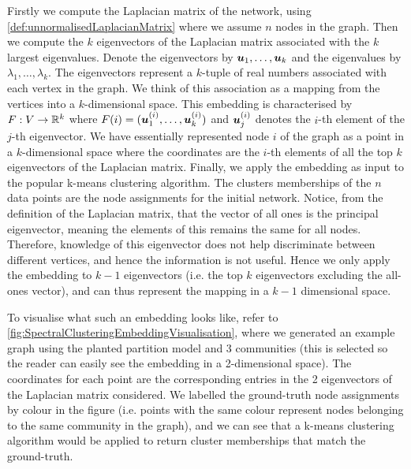Firstly we compute the Laplacian matrix of the network, using \cref{def:unnormalisedLaplacianMatrix} where we assume $n$ nodes in the graph.
Then we compute the $k$ eigenvectors of the Laplacian matrix associated with the $k$ largest eigenvalues.
Denote the eigenvectors by $\vecvar{u}_{1},\dots,\vecvar{u}_{k}$ and the eigenvalues by $\lambda_{1},\dots,\lambda_{k}$.
The eigenvectors represent a $k$-tuple of real numbers associated with each vertex in the graph. 
We think of this association as a mapping from the vertices into a $k$-dimensional space.
This embedding is characterised by $F : V \rightarrow \mathbb{R}^{k}$ where $F(i) = (\vecvar{u}_{1}^{(i)},\dots,\vecvar{u}_{k}^{(i)})$ and $\vecvar{u}_{j}^{(i)}$ denotes the $i$-th element of the $j$-th eigenvector.
We have essentially represented node $i$ of the graph as a point in a $k$-dimensional space where the coordinates are the $i$-th elements of all the top $k$ eigenvectors of the Laplacian matrix.
Finally, we apply the embedding as input to the popular k-means clustering algorithm.
The clusters memberships of the $n$ data points are the node assignments for the initial network.
Notice, from the definition of the Laplacian matrix, that the vector of all ones is the principal eigenvector, meaning the elements of this remains the same for all nodes.
Therefore, knowledge of this eigenvector does not help discriminate between different vertices, and hence the information is not useful.
Hence we only apply the embedding to $k-1$ eigenvectors (i.e. the top $k$ eigenvectors excluding the all-ones vector), and can thus represent the mapping in a $k-1$ dimensional space.

To visualise what such an embedding looks like, refer to \cref{fig:SpectralClusteringEmbeddingVisualisation}, where we generated an example graph using the planted partition model and 3 communities (this is selected so the reader can easily see the embedding in a 2-dimensional space).
The coordinates for each point are the corresponding entries in the 2 eigenvectors of the Laplacian matrix considered.
We labelled the ground-truth node assignments by colour in the figure (i.e. points with the same colour represent nodes belonging to the same community in the graph), and we can see that a k-means clustering algorithm would be applied to return cluster memberships that match the ground-truth.

